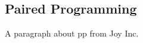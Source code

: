 \documentclass[letterpaper, 12pt]{memoir}
\title{}  %
\begin{document}
\subsection{Paired Programming}
A paragraph about pp from Joy Inc.
\end{document}

